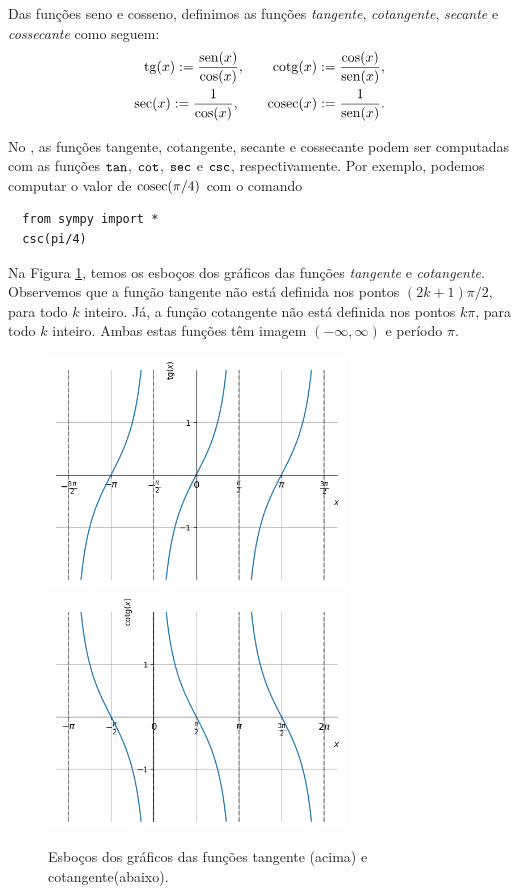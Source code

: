 Das funções seno e cosseno, definimos as funções \emph{tangente}, \emph{cotangente}, \emph{secante} e \emph{cossecante} como seguem:
\begin{align}
  \operatorname{tg}(x) := \frac{\operatorname{sen}(x)}{\cos(x)},\qquad \operatorname{cotg}(x) := \frac{\cos(x)}{\operatorname{sen}(x)},\\
  \sec(x) := \frac{1}{\cos(x)},\qquad \operatorname{cosec}(x) := \frac{1}{\operatorname{sen}(x)}.
\end{align}

\ifispython
No {\sympy}, as funções tangente, cotangente, secante e cossecante podem ser computadas com as funções $\verb+tan+$, $\verb+cot+$, $\verb+sec+$ e $\verb+csc+$, respectivamente. Por exemplo, podemos computar o valor de $\operatorname{cosec}(\pi/4)$ com o comando
\begin{lstlisting}
  from sympy import *
  csc(pi/4)
\end{lstlisting}
\fi

Na Figura \ref{fig:co_tg_graficos}, temos os esboços dos gráficos das funções \emph{tangente} e \emph{cotangente}. Observemos que a função tangente não está definida nos pontos $(2k+1)\pi/2$, para todo $k$ inteiro. Já, a função cotangente não está definida nos pontos $k\pi$, para todo $k$ inteiro. Ambas estas funções têm imagem $(-\infty, \infty)$ e período $\pi$.

\begin{figure}[H]
  \centering
  \includegraphics[width=0.7\textwidth]{./cap_funcao/dados/fig_co_tg_graficos/fig_tg_grafico}\\
  \includegraphics[width=0.7\textwidth]{./cap_funcao/dados/fig_co_tg_graficos/fig_cotg_grafico}
  \caption{Esboços dos gráficos das funções tangente (acima) e cotangente(abaixo).}
  \label{fig:co_tg_graficos}
\end{figure}

